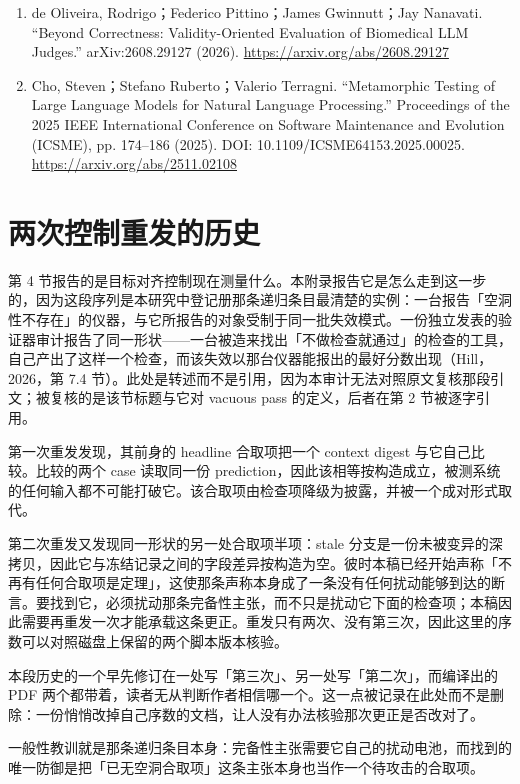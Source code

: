 \documentclass[UTF8,11pt]{ctexart}
\begin{document}
\begin{enumerate}[leftmargin=*,nosep]
\item de Oliveira, Rodrigo；Federico Pittino；James Gwinnutt；Jay Nanavati. ``Beyond Correctness: Validity-Oriented Evaluation of Biomedical LLM Judges.'' arXiv:2608.29127 (2026). \url{https://arxiv.org/abs/2608.29127}
\item Cho, Steven；Stefano Ruberto；Valerio Terragni. ``Metamorphic Testing of Large Language Models for Natural Language Processing.'' Proceedings of the 2025 IEEE International Conference on Software Maintenance and Evolution (ICSME), pp. 174--186 (2025). DOI: 10.1109/ICSME64153.2025.00025. \url{https://arxiv.org/abs/2511.02108}
\end{enumerate}
\appendix
\section{两次控制重发的历史}
\label{app:reissue-history-zh}
第 4 节报告的是目标对齐控制现在测量什么。本附录报告它是怎么走到这一步的，因为这段序列是本研究中登记册那条递归条目最清楚的实例：一台报告「空洞性不存在」的仪器，与它所报告的对象受制于同一批失效模式。一份独立发表的验证器审计报告了同一形状——一台被造来找出「不做检查就通过」的检查的工具，自己产出了这样一个检查，而该失效以那台仪器能报出的最好分数出现（Hill，2026，第 7.4 节）。此处是转述而不是引用，因为本审计无法对照原文复核那段引文；被复核的是该节标题与它对 vacuous pass 的定义，后者在第 2 节被逐字引用。

第一次重发发现，其前身的 headline 合取项把一个 context digest 与它自己比较。比较的两个 case 读取同一份 prediction，因此该相等按构造成立，被测系统的任何输入都不可能打破它。该合取项由检查项降级为披露，并被一个成对形式取代。

第二次重发又发现同一形状的另一处合取项半项：stale 分支是一份未被变异的深拷贝，因此它与冻结记录之间的字段差异按构造为空。彼时本稿已经开始声称「不再有任何合取项是定理」，这使那条声称本身成了一条没有任何扰动能够到达的断言。要找到它，必须扰动那条完备性主张，而不只是扰动它下面的检查项；本稿因此需要再重发一次才能承载这条更正。重发只有两次、没有第三次，因此这里的序数可以对照磁盘上保留的两个脚本版本核验。

本段历史的一个早先修订在一处写「第三次」、另一处写「第二次」，而编译出的 PDF 两个都带着，读者无从判断作者相信哪一个。这一点被记录在此处而不是删除：一份悄悄改掉自己序数的文档，让人没有办法核验那次更正是否改对了。

一般性教训就是那条递归条目本身：完备性主张需要它自己的扰动电池，而找到的唯一防御是把「已无空洞合取项」这条主张本身也当作一个待攻击的合取项。
\end{document}
